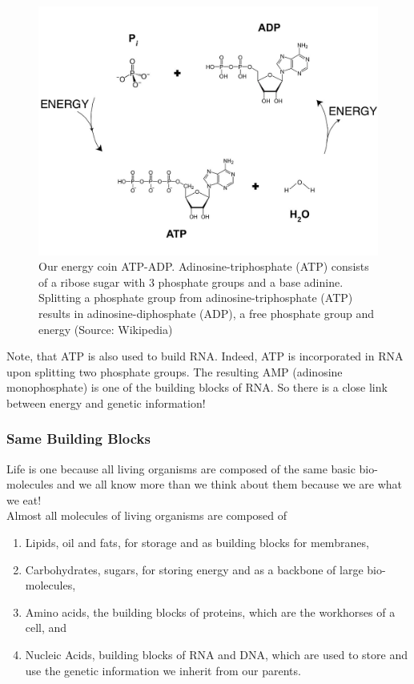 \documentclass[
  11pt,
]{book}
\providecommand{\tightlist}{%
  \setlength{\itemsep}{0pt}\setlength{\parskip}{0pt}}
\begin{document}
\begin{figure}

{\centering \includegraphics[width=0.7\linewidth]{./figs/ATP-ADP} 

}

\caption{Our energy coin ATP-ADP. Adinosine-triphosphate (ATP) consists of a ribose sugar with 3 phosphate groups and a base adinine. Splitting a phosphate group from adinosine-triphosphate (ATP) results in adinosine-diphosphate (ADP), a free phosphate group and energy (Source: Wikipedia)}\label{fig:atp-adp}
\end{figure}

Note, that ATP is also used to build RNA. Indeed, ATP is incorporated in RNA upon splitting two phosphate groups. The resulting AMP (adinosine monophosphate) is one of the building blocks of RNA. So there is a close link between energy and genetic information!

\hypertarget{same-building-blocks}{%
\subsubsection{Same Building Blocks}\label{same-building-blocks}}

Life is one because all living organisms are composed of the same basic bio-molecules and we all know more than we think about them because we are what we eat!\\
Almost all molecules of living organisms are composed of

\begin{enumerate}
\def\labelenumi{\arabic{enumi}.}
\tightlist
\item
  Lipids, oil and fats, for storage and as building blocks for membranes,
\item
  Carbohydrates, sugars, for storing energy and as a backbone of large bio-molecules,
\item
  Amino acids, the building blocks of proteins, which are the workhorses of a cell, and
\item
  Nucleic Acids, building blocks of RNA and DNA, which are used to store and use the genetic information we inherit from our parents.
\end{enumerate}
\end{document}
